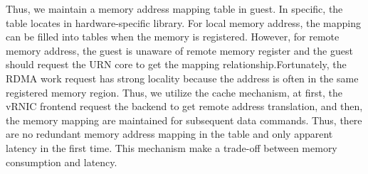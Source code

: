 Thus, we maintain a memory address mapping table in guest. In specific, the table locates in hardware-specific library. For local memory address, the mapping can be filled into tables when the memory is registered. However, for remote memory address, the guest is unaware of remote memory register and the guest should request the URN core to get the mapping relationship.Fortunately, the RDMA work request has strong locality because the address is often in the same registered memory region. Thus, we utilize the cache mechanism, at first, the vRNIC frontend request the backend to get remote address translation, and then, the memory mapping are maintained for subsequent data commands. Thus, there are no redundant memory address mapping in the table and only apparent latency in the first time. This mechanism make a trade-off between memory consumption and latency.

